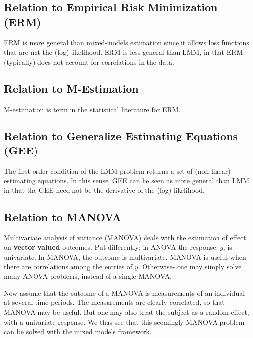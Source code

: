 \documentclass[]{book}
\theoremstyle{definition}
\theoremstyle{definition}
\theoremstyle{definition}
\theoremstyle{remark}
\begin{document}
\hypertarget{relation-to-empirical-risk-minimization-erm}{%
\subsection{Relation to Empirical Risk Minimization (ERM)}\label{relation-to-empirical-risk-minimization-erm}}

ERM is more general than mixed-models estimation since it allows loss functions that are not the (log) likelihood.
ERM is less general than LMM, in that ERM (typically) does not account for correlations in the data.

\hypertarget{relation-to-m-estimation}{%
\subsection{Relation to M-Estimation}\label{relation-to-m-estimation}}

M-estimation is term in the statistical literature for ERM.

\hypertarget{relation-to-generalize-estimating-equations-gee}{%
\subsection{Relation to Generalize Estimating Equations (GEE)}\label{relation-to-generalize-estimating-equations-gee}}

The first order condition of the LMM problem returns a set of (non-linear) estimating equations.
In this sense, GEE can be seen as more general than LMM in that the GEE need not be the derivative of the (log) likelihood.

\hypertarget{manova}{%
\subsection{Relation to MANOVA}\label{manova}}

Multivariate analysis of variance (MANOVA) deals with the estimation of effect on \textbf{vector valued} outcomes.
Put differently: in ANOVA the response, \(y\), is univariate.
In MANOVA, the outcome is multivariate.
MANOVA is useful when there are correlations among the entries of \(y\).
Otherwise- one may simply solve many ANOVA problems, instead of a single MANOVA.

Now assume that the outcome of a MANOVA is measurements of an individual at several time periods.
The measurements are clearly correlated, so that MANOVA may be useful.
But one may also treat the subject as a random effect, with a univariate response.
We thus see that this seemingly MANOVA problem can be solved with the mixed models framework.
\end{document}
